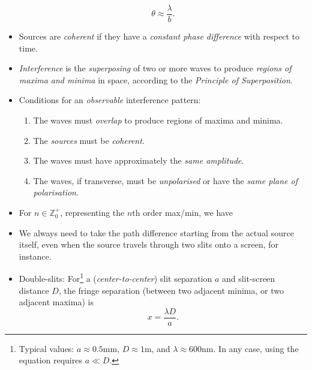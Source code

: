 \documentclass[oneside]{book}
\begin{document}
\begin{itemize}
    \[\theta \approx \frac{\lambda}{b}.\]
    \item Sources are \emph{coherent} if they have a \emph{constant phase difference} with respect to time.
    \item \emph{Interference} is the \emph{superposing} of two or more waves to produce \emph{regions of maxima and minima} in space, according to the \emph{Principle of Superposition}.
    \item Conditions for an \emph{observable} interference pattern: 
    \begin{enumerate}
        \item The waves must \emph{overlap} to produce regions of maxima and minima.
        \item The \emph{sources} must be \emph{coherent}.
        \item The waves must have approximately the \emph{same amplitude}.
        \item The waves, if transverse, must be \emph{unpolarised} or have the \emph{same plane of polarisation}. 
    \end{enumerate}
    \item For \(n \in \mathbb{Z}^{+}_{0}\), representing the \(n\)th order max/min, we have 
    \item We always need to take the path difference starting from the actual source itself, even when the source travels through two slits onto a screen, for instance.
    \item Double-slits: For\footnote{Typical values: \(a \approx 0.5\)mm, \(D \approx 1\)m, and \(\lambda \approx 600\)nm. In any case, using the equation requires \(a\ll D\).} a (\emph{center-to-center}) slit separation \(a\) and slit-screen distance \(D\), the fringe separation (between two adjacent minima, or two adjacent maxima) is
    \[x=\frac{\lambda D}{a}.\]

\end{itemize}
\end{document}
